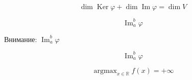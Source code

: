 \documentclass[a4paper, 12pt]{article}
\DeclareMathOperator{\Kerr}{Ker}
\DeclareMathOperator{\Imm}{Im} %
\DeclareMathOperator*{\Imma}{Im} %
\DeclareMathOperator*{\argmax}{argmax}
\begin{document}
    \[\dim \Kerr \varphi + \dim \Imm \varphi = \dim V\]

    \[\Imm_a^b \varphi\] %

    Внимание: $\Imma_a^b \varphi$ %
    
    \[\Imma_a^b \varphi\] %

    \[\argmax_{x \in \mathbb R} f(x) = + \infty\]
\end{document}

